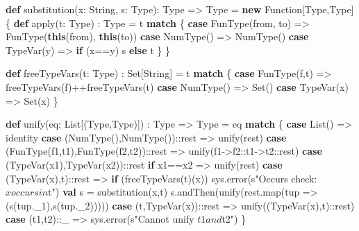 \documentclass[]{article}
\newenvironment{Shaded}{}{}
\newcommand{\FunctionTok}[1]{\textcolor[rgb]{0.02,0.16,0.49}{#1}}
\newcommand{\KeywordTok}[1]{\textcolor[rgb]{0.00,0.44,0.13}{\textbf{#1}}}
\newcommand{\NormalTok}[1]{#1}
\newcommand{\StringTok}[1]{\textcolor[rgb]{0.25,0.44,0.63}{#1}}
\begin{document}
\begin{Shaded}
\begin{Highlighting}[]
\KeywordTok{def} \FunctionTok{substitution}\NormalTok{(x: String, s: Type): Type =\textgreater{} Type = }\KeywordTok{new}\NormalTok{ Function[Type,Type] \{}
  \KeywordTok{def} \FunctionTok{apply}\NormalTok{(t: Type) : Type = t }\KeywordTok{match}\NormalTok{ \{}
    \KeywordTok{case} \FunctionTok{FunType}\NormalTok{(from, to) =\textgreater{} }\FunctionTok{FunType}\NormalTok{(}\KeywordTok{this}\NormalTok{(from), }\KeywordTok{this}\NormalTok{(to))}
    \KeywordTok{case} \FunctionTok{NumType}\NormalTok{() =\textgreater{} }\FunctionTok{NumType}\NormalTok{()}
    \KeywordTok{case} \FunctionTok{TypeVar}\NormalTok{(y) =\textgreater{} }\KeywordTok{if}\NormalTok{ (x==y) s }\KeywordTok{else}\NormalTok{ t}
\NormalTok{  \}}
\NormalTok{\}}

\KeywordTok{def} \FunctionTok{freeTypeVars}\NormalTok{(t: Type) : Set[String] = t }\KeywordTok{match}\NormalTok{ \{}
  \KeywordTok{case} \FunctionTok{FunType}\NormalTok{(f,t) =\textgreater{} }\FunctionTok{freeTypeVars}\NormalTok{(f)++}\FunctionTok{freeTypeVars}\NormalTok{(t)}
  \KeywordTok{case} \FunctionTok{NumType}\NormalTok{() =\textgreater{} Set()}
  \KeywordTok{case} \FunctionTok{TypeVar}\NormalTok{(x) =\textgreater{} Set(x)}
\NormalTok{\}}

\KeywordTok{def} \FunctionTok{unify}\NormalTok{(eq: List[(Type,Type)]) : Type =\textgreater{} Type = eq }\KeywordTok{match}\NormalTok{ \{}
  \KeywordTok{case}\NormalTok{ List() =\textgreater{} identity}
  \KeywordTok{case}\NormalTok{ (}\FunctionTok{NumType}\NormalTok{(),}\FunctionTok{NumType}\NormalTok{())::rest =\textgreater{} }\FunctionTok{unify}\NormalTok{(rest)}
  \KeywordTok{case}\NormalTok{ (}\FunctionTok{FunType}\NormalTok{(f1,t1),}\FunctionTok{FunType}\NormalTok{(f2,t2))::rest =\textgreater{} }\FunctionTok{unify}\NormalTok{(f1{-}\textgreater{}f2::t1{-}\textgreater{}t2::rest)}
  \KeywordTok{case}\NormalTok{ (}\FunctionTok{TypeVar}\NormalTok{(x1),}\FunctionTok{TypeVar}\NormalTok{(x2))::rest }\KeywordTok{if}\NormalTok{ x1==x2 =\textgreater{} }\FunctionTok{unify}\NormalTok{(rest)}
  \KeywordTok{case}\NormalTok{ (}\FunctionTok{TypeVar}\NormalTok{(x),t)::rest =\textgreater{}}
    \KeywordTok{if}\NormalTok{ (}\FunctionTok{freeTypeVars}\NormalTok{(t)(x)) sys.}\FunctionTok{error}\NormalTok{(s}\StringTok{"Occurs check: $x occurs in $t"}\NormalTok{)}
    \KeywordTok{val}\NormalTok{ s = }\FunctionTok{substitution}\NormalTok{(x,t)}
\NormalTok{    s.}\FunctionTok{andThen}\NormalTok{(}\FunctionTok{unify}\NormalTok{(rest.}\FunctionTok{map}\NormalTok{(tup =\textgreater{} (}\FunctionTok{s}\NormalTok{(tup.}\FunctionTok{\_1}\NormalTok{),}\FunctionTok{s}\NormalTok{(tup.}\FunctionTok{\_2}\NormalTok{)))))}
  \KeywordTok{case}\NormalTok{ (t,}\FunctionTok{TypeVar}\NormalTok{(x))::rest =\textgreater{} }\FunctionTok{unify}\NormalTok{((}\FunctionTok{TypeVar}\NormalTok{(x),t)::rest)}
  \KeywordTok{case}\NormalTok{ (t1,t2)::\_ =\textgreater{} sys.}\FunctionTok{error}\NormalTok{(s}\StringTok{"Cannot unify $t1 and $t2"}\NormalTok{)}
\NormalTok{\}}
\end{Highlighting}
\end{Shaded}
\end{document}
